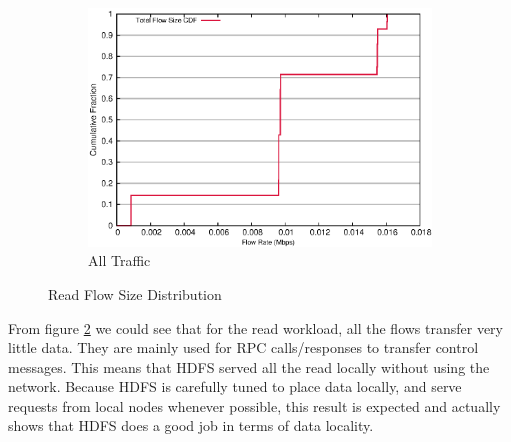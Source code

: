 \begin{figure}[!htpb]
\begin{subfigure}[b]{.55\linewidth}
   \centering
	\includegraphics[width=.99\textwidth]{figures/4read/flow_size.eps}
	\caption{All Traffic}\label{fig:read_size:all}
   \end{subfigure}%
\caption{Read Flow Size Distribution}
\label{fig:read_size}
\end{figure}

From figure \ref{fig:read_size} we could see that for the read workload, all the flows transfer very little data. They are mainly used for RPC calls/responses to transfer control messages. This means that HDFS served all the read locally without using the network. Because HDFS is carefully tuned to place data locally, and serve requests from local nodes whenever possible, this result is expected and actually shows that HDFS does a good job in terms of data locality.

